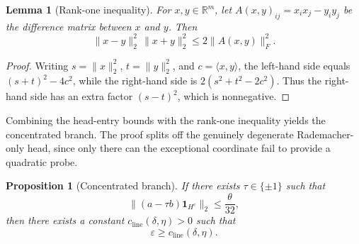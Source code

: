 \documentclass[11pt]{amsart}
\numberwithin{equation}{section}
\newtheorem{proposition}[theorem]{Proposition}
\newtheorem{lemma}[theorem]{Lemma}
\theoremstyle{definition}
\theoremstyle{remark}
\newcommand{\R}{\mathbb R}
\newcommand{\eps}{\varepsilon}
\newcommand{\norm}[1]{\lVert #1 \rVert}
\newcommand{\ip}[2]{\langle #1,#2\rangle}
\begin{document}
\begin{lemma}[Rank-one inequality]\label{lem:rank-one}
For $x,y\in\R^m$, let $A(x,y)_{ij}=x_ix_j-y_iy_j$ be the difference matrix between $x$ and $y$. Then
\[
\norm{x-y}_2^2\,\norm{x+y}_2^2\le 2\norm{A(x,y)}_F^2.
\]
\end{lemma}

\begin{proof}
Writing $s=\norm{x}_2^2$, $t=\norm{y}_2^2$, and $c=\ip{x}{y}$, the left-hand
side equals $(s+t)^2-4c^2$, while the right-hand side is
$2(s^2+t^2-2c^2)$.  Thus the right-hand side has an extra factor $(s-t)^2$, which is nonnegative.
\end{proof}

Combining the head-entry bounds with the rank-one inequality yields the
concentrated branch.  The proof splits off the genuinely degenerate
Rademacher-only head, since only there can the exceptional coordinate fail to
provide a quadratic probe.

\begin{proposition}[Concentrated branch]\label{prop:concentrated}
If there exists $\tau\in\{\pm1\}$ such that
\[
\norm{(a-\tau b)\mathbf 1_{H^c}}_2\le \frac{\theta}{32},
\]
then there exists a constant $c_{\mathrm{line}}(\delta,\eta)>0$ such that
\[
\eps\ge c_{\mathrm{line}}(\delta,\eta).
\]
\end{proposition}
\end{document}
